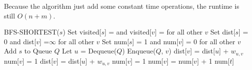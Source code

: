 \documentclass[a4paper,12pt]{article}
\begin{document}
Because the algorithm just add some constant time operations, the
runtime is still $O(n+m)$.

\begin{algorithm}
\begin{algorithmic}[1]
\STATE BFS-SHORTEST($s$)
\STATE Set visited[$s$] = \TRUE \;and visited[$v$] = \FALSE \;for all
other $v$
\STATE Set dist[$s$] = 0 and dist[$v$] =$\infty$ for all other $v$
\STATE Set num[$s$] = 1 and num[$v$] = 0 for all other $v$
\STATE Add $s$ to Queue $Q$
\STATE Let $u$ = Dequeue($Q$)
\STATE Enqueue($Q$, $v$)
\STATE dist[$v$] = dist[$u$] + $w_{u,v}$
\STATE num[$v$] = 1
\ELSE
{}
\STATE dist[$v$] = dist[$u$] + $w_{u,v}$
\STATE num[$v$] = 1
\STATE num[$v$] = num[$v$] + 1
\ENDIF
\ENDIF
\ENDFOR
\ENDWHILE
\RETURN num[$t$]
\end{algorithmic}
\end{algorithm}
\end{document}
